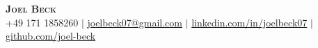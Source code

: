 
\begin{center}
    \textbf{\Huge \scshape Joel Beck} \\
    \vspace{4pt}
    \small +49 171 1858260 $|$
    \href{mailto:joelbeck07@gmail.com}{joelbeck07@gmail.com} $|$
    \href{https://www.linkedin.com/in/joelbeck07}{linkedin.com/in/joelbeck07} $|$
    \href{https://github.com/joel-beck}{github.com/joel-beck}
\end{center}